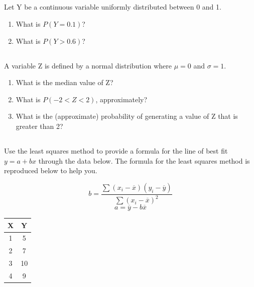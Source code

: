 \documentclass[twocolumn]{article}
\newcommand\mrk[1]{}
\begin{document}
\subsection{}

Let Y be a continuous variable uniformly distributed between 0 and 1.

\begin{enumerate}
    \item What is $P(Y = 0.1)$? \mrk{1}
    \item What is $P(Y > 0.6)$? \mrk{1}
\end{enumerate}

\subsection{}

A variable Z is defined by a normal distribution where $\mu = 0$ and $\sigma = 1$.

\begin{enumerate}
    \item What is the median value of Z? \mrk{1}
    \item What is $P(-2 < Z < 2)$, approximately? \mrk{1}
    \item What is the (approximate) probability of generating a value of Z that is greater than 2? \mrk{1}
\end{enumerate}

\iffalse


\subsection{}

    Use the least squares method to provide a formula for the line of best fit $y = a + bx$ through the data below. The formula for the least squares method is reproduced below to help you. \mrk{1}

    \begin{multicols}{2}
    $$ b = \frac{\sum{(x_i - \overline{x})(y_i - \overline{y})}}{\sum{(x_i - \overline{x})^2}} $$
    $$ a = \overline{y} - b\overline{x}$$
    \begin{center}
        \begin{tabular}{c | c}
            \toprule
            X & Y  \\
            \midrule
            1 & 5 \\
            2 & 7 \\
            3 & 10 \\
            4 & 9 \\
            \bottomrule
        \end{tabular}        
    \end{center}
\end{multicols}
\end{document}
